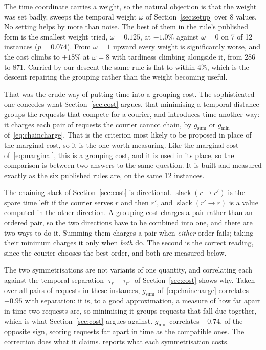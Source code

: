 The time coordinate carries a weight, so the natural objection is that the
weight was set badly.  sweeps the
temporal weight $\omega$ of Section~\ref{sec:setup} over 8 values. No
setting helps by more than noise. The best of them in the rule's published form
is the smallest weight tried, $\omega=0.125$, at
$-1.0\%$ against $\omega=0$ on
7 of 12 instances
($p=0.074$). From $\omega=1$ upward every weight is
significantly worse, and the cost climbs to $+18\%$ at
$\omega=8$ with tardiness climbing alongside it, from
286 to 871.
Carried by our descent the same rule is flat to within 4\%, which is
the descent repairing the grouping rather than the weight becoming useful.


That was the crude way of putting time into a grouping cost. The sophisticated one
concedes what Section~\ref{sec:cost} argues, that minimising a temporal distance
groups the requests that compete for a courier, and introduces time another
way: it
charges each pair of requests the courier cannot chain, by
$g_{\mathrm{sum}}$ or $g_{\min}$ of~\eqref{eq:chaincharge}. That is the
criterion most likely to be proposed in place of the marginal cost, so it is the
one worth measuring. Like the marginal cost of~\eqref{eq:marginal}, this is a
grouping cost, and it is used in its place, so the comparison is between two
answers to the same question. It is built and measured exactly as the six
published rules are, on the same 12 instances.

The chaining slack of Section~\ref{sec:cost} is directional.
$\operatorname{slack}(r\!\to\!r')$ is the spare time left if the courier
serves $r$ and then $r'$, and $\operatorname{slack}(r'\!\to\!r)$ is a
value computed in the other direction. A grouping cost charges a pair rather than an ordered pair, so
the two directions have to be combined into one, and there are two ways to do it.
Summing them charges a pair when \emph{either} order fails; taking their
minimum charges it only when \emph{both} do. The second is the correct reading,
since the courier chooses the best order, and both are measured below.

The two symmetrisations are not variants of one quantity, and correlating each
against the temporal separation $|\tau_r-\tau_{r'}|$ of
Section~\ref{sec:cost} shows why. Taken over all pairs of requests in these
instances, $g_{\mathrm{sum}}$ of~\eqref{eq:chaincharge} correlates $+0.95$ with
separation: it is, to a good approximation, a measure of how far apart in time
two requests are, so minimising it groups requests that fall due together, which
is what Section~\ref{sec:cost} argues against. $g_{\min}$ correlates
$-0.74$, of the opposite sign, scoring requests far apart in
time as the compatible ones. The correction does what it claims.
 reports what each symmetrisation
costs.

